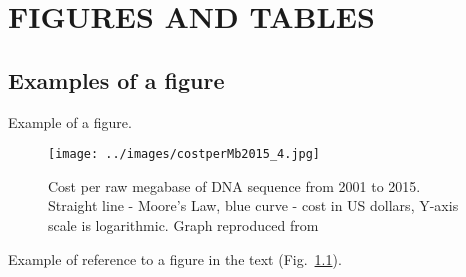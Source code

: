 \chapter{FIGURES AND TABLES}
\section{Examples of a figure}

Example of a figure.
\begin{figure}[ht!]
\begin{center}
\texttt{[image: ../images/costperMb2015\_4.jpg]}
\end{center}
\caption[hehe]{Cost per raw megabase of DNA sequence from 2001 to 2015. Straight line - Moore's Law, blue curve - cost in US dollars, Y-axis scale is logarithmic. Graph reproduced from \citep{wetterstrand2016}}
\label{fig_dna_cost}
\end{figure}

Example of reference to a figure in the text (Fig.~\ref{fig_dna_cost}). \lipsum[3]


